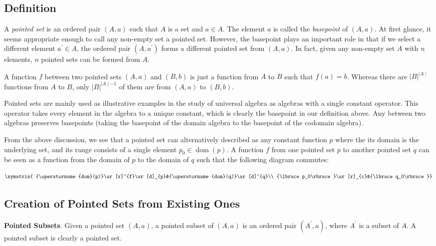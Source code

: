 \documentclass[12pt]{article}
\begin{document}
\subsection{Definition}
A \emph{pointed set} is an ordered pair $(A,a)$ such that $A$ is a set and $a\in A$.  The element $a$ is called the \emph{basepoint} of $(A,a)$.  At first glance, it seems appropriate enough to call any non-empty set a pointed set.  However, the basepoint plays an important role in that if we select a different element $a^{\prime}\in A$, the ordered pair $(A,a^{\prime})$ forms a different pointed set from $(A,a)$.  In fact, given any non-empty set $A$ with $n$ elements, $n$ pointed sets can be formed from $A$.

A function $f$ between two pointed sets $(A,a)$ and $(B,b)$ is just a function from $A$ to $B$ such that $f(a)=b$.  Whereas there are $|B|^{\mid A\mid}$ functions from $A$ to $B$, only $|B|^{\mid A\mid-1}$ of them are from $(A,a)$ to $(B,b)$.

Pointed sets are mainly used as illustrative examples in the study of universal algebra as algebras with a single constant operator.  This operator takes every element in the algebra to a unique constant, which is clearly the basepoint in our definition above.  Any  between two algebras preserves basepoints (taking the basepoint of the domain algebra to the basepoint of the codomain algebra).

From the above discussion, we see that a pointed set can alternatively described as any constant function $p$ where the its domain is the underlying set, and its range consists of a single element $p_0\in \operatorname{dom}(p)$.  A function $f$ from one pointed set $p$ to another pointed set $q$ can be seen as a function from the domain of $p$ to the domain of $q$ such that the following diagram commutes:

$$\xymatrix{
{\operatorname{dom}(p)}\ar[r]^{f}\ar[d]_{p}&{\operatorname{dom}(q)}\ar[d]^{q}\\
{\lbrace p_0\rbrace}\ar[r]_{c}&{\lbrace q_0\rbrace}}
$$


\subsection{Creation of Pointed Sets from Existing Ones}
\textbf{Pointed Subsets}.  Given a pointed set $(A,a)$, a pointed subset of $(A,a)$ is an ordered pair $(A^{\prime},a)$, where $A^{\prime}$ is a subset of $A$.  A pointed subset is clearly a pointed set.
\end{document}
